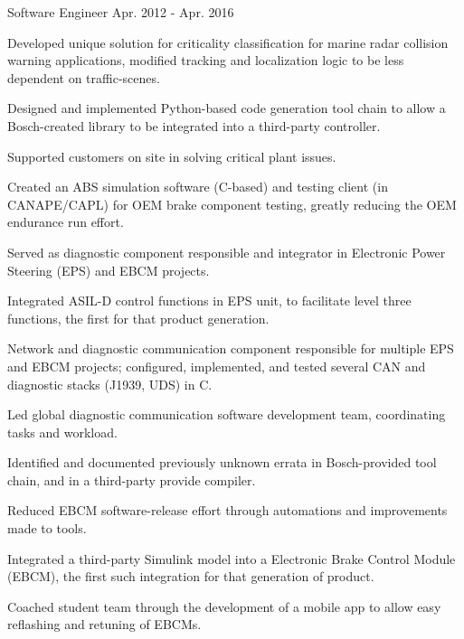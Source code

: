 \begin{cventries}
  \cventry
    {Software Engineer} %
    {} %
    {} %
    {Apr. 2012 - Apr. 2016} %
    {
      \begin{cvitems} %
        \item {Developed unique solution for criticality classification for marine radar collision warning applications, modified tracking and localization logic to be less dependent on traffic-scenes.}
        \item {Designed and implemented Python-based code generation tool chain to allow a Bosch-created library to be integrated into a third-party controller.}
        \item {Supported customers on site in solving critical plant issues.}
        \item {Created an ABS simulation software (C-based) and testing client (in CANAPE/CAPL) for OEM brake component testing, greatly reducing the OEM endurance run effort.}
        \item {Served as diagnostic component responsible and integrator in Electronic Power Steering (EPS) and EBCM projects.}
        \item {Integrated ASIL-D control functions in EPS unit, to facilitate level three functions, the first for that product generation.}
        \item {Network and diagnostic communication component responsible for multiple EPS and EBCM projects; configured, implemented, and tested several CAN and diagnostic stacks (J1939, UDS) in C.}
        \item {Led global diagnostic communication software development team, coordinating tasks and workload.}
        \iflongform     
          \item {Identified and documented previously unknown errata in Bosch-provided tool chain, and in a third-party provide compiler.}
          \item {Reduced EBCM software-release effort through automations and improvements made to tools.}
          \item {Integrated a third-party Simulink model into a Electronic Brake Control Module (EBCM), the first such integration for that generation of product.}
          \item {Coached student team through the development of a mobile app to allow easy reflashing and retuning of EBCMs.}
        \fi
      \end{cvitems}
    }
\end{cventries}
